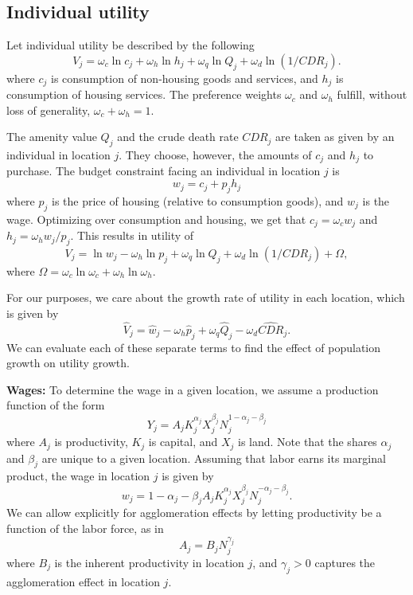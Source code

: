 \documentclass[10pt]{article}
\begin{document}
 
\subsection{Individual utility}
Let individual utility be described by the following
\begin{equation}
    V_j = \omega_c \ln c_j + \omega_h \ln h_j + \omega_q \ln Q_j + \omega_d \ln (1/CDR_j).
\end{equation}
where $c_j$ is consumption of non-housing goods and services, and $h_j$ is consumption of housing services. The preference weights $\omega_c$ and $\omega_h$ fulfill, without loss of generality, $\omega_c + \omega_h = 1$. 

The amenity value $Q_j$ and the crude death rate $CDR_j$ are taken as given by an individual in location $j$. They choose, however, the amounts of $c_j$ and $h_j$ to purchase.  The budget constraint facing an individual in location $j$ is
\begin{equation}
    w_j = c_j + p_j h_j
\end{equation}
where $p_j$ is the price of housing (relative to consumption goods), and $w_j$ is the wage. Optimizing over consumption and housing, we get that $c_j = \omega_c w_j$ and $h_j = \omega_h w_j/p_j$. This results in utility of
\begin{equation}
    V_j = \ln w_j - \omega_h \ln p_j + \omega_q \ln Q_j + \omega_d \ln (1/CDR_j) + \Omega,
\end{equation}
where $\Omega = \omega_c \ln \omega_c + \omega_h \ln \omega_h$. 

For our purposes, we care about the growth rate of utility in each location, which is given by
\begin{equation}
    \hat{V}_j = \hat{w}_j - \omega_h \hat{p}_j + \omega_q \hat{Q}_j - \omega_d \hat{CDR}_j.
\end{equation}
We can evaluate each of these separate terms to find the effect of population growth on utility growth.

\textbf{Wages:} To determine the wage in a given location, we assume a production function of the form
\begin{equation}
    Y_j = A_j K_j^{\alpha_j} X_j^{\beta_j} N_j^{1 - \alpha_j - \beta_j}
\end{equation}
where $A_j$ is productivity, $K_j$ is capital, and $X_j$ is land. Note that the shares $\alpha_j$ and $\beta_j$ are unique to a given location. Assuming that labor earns its marginal product, the wage in location $j$ is given by
\begin{equation}
    w_j = {1 - \alpha_j - \beta_j} A_j K_j^{\alpha_j} X_j^{\beta_j} N_j^{- \alpha_j - \beta_j}.
\end{equation}
We can allow explicitly for agglomeration effects by letting productivity be a function of the labor force, as in
\begin{equation}
    A_j = B_j N_j^{\gamma_j}
\end{equation}
where $B_j$ is the inherent productivity in location $j$, and $\gamma_j>0$ captures the agglomeration effect in location $j$. 
\end{document}
